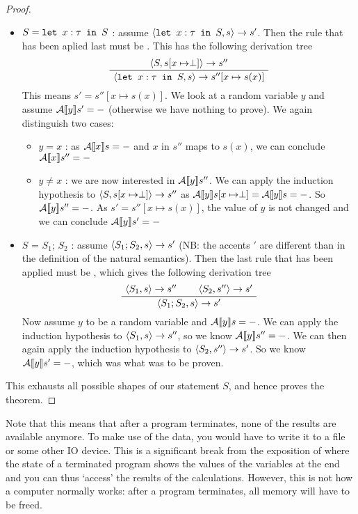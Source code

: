 \begin{proof}
\begin{itemize}[noitemsep]
    \item  $S = \texttt{let }x : \tau \texttt{ in } S$ : assume $\langle \texttt{let }x : \tau \texttt{ in } S, s \rangle \to s'$. Then the rule that has been aplied last must be . This has the following derivation tree 
    $$\AxiomC{$\ns{S}{s[x\mapsto \perp]}{s''}$}
\UnaryInfC{$\ns{\letm{x}{S}}{s}{s''[x \mapsto s(x)]}$}
\DisplayProof$$
This means $s' = s''[x \mapsto s(x)]$.
We look at a random variable $y$ and assume $\mathcal{A} \llbracket y \rrbracket s' = -$ (otherwise we have nothing to prove). We again distinguish two cases:
    \begin{itemize}[noitemsep]
        \item $y=x$ : as $\mathcal{A} \llbracket x \rrbracket s = -$ and $x$ in $s''$ maps to $s(x)$, we can conclude $\mathcal{A} \llbracket x \rrbracket s'' = -$
        \item $y\neq x$ : we are now interested in $\mathcal{A} \llbracket y \rrbracket s''$. We can apply the induction hypothesis to $\langle S, s[x\mapsto \perp] \rangle \to s''$ as $\mathcal{A} \llbracket y \rrbracket s[x\mapsto \perp] = \mathcal{A} \llbracket y \rrbracket s = -$. So $\mathcal{A} \llbracket y \rrbracket s'' = -$. As $s' = s''[x \mapsto s(x)]$, the value of $y$ is not changed and we can conclude $\mathcal{A} \llbracket y \rrbracket s' = -$
    \end{itemize}
    \item $S$ = $S_1$; $S_2$ : assume $\langle S_1;S_2, s \rangle \to s'$ (NB: the accents $'$ are different than in the definition of the natural semantics). Then the last rule that has been applied must be \compns, which gives the following derivation tree 
    $$\AxiomC{$\ns{S_1}{s}{s''} $}
\AxiomC{$\ns{S_2}{s''}{s'}$}
\BinaryInfC{$\ns{S_1;S_2}{s}{s'}$}
\DisplayProof$$
Now assume $y$ to be a random variable and $\mathcal{A} \llbracket y \rrbracket s = -$. We can apply the induction hypothesis to $\langle S_1, s \rangle \to s''$, so we know $\mathcal{A} \llbracket y \rrbracket s'' = -$. We can then again apply the induction hypothesis to $\langle S_2, s'' \rangle \to s'$. So we know $\mathcal{A} \llbracket y \rrbracket s' = -$, which was what was to be proven.
\end{itemize} 
This exhausts all possible shapes of our statement $S$, and hence proves the theorem.
\end{proof}

Note that this means that after a program terminates, none of the results are available anymore. To make use of the data, you would have to write it to a file or some other IO device. This is a significant break from the exposition of \cite{nielson1992semantics} where the state of a terminated program shows the values of the variables at the end and you can thus `access' the results of the calculations. However, this is not how a computer normally works: after a program terminates, all memory will have to be freed. 

